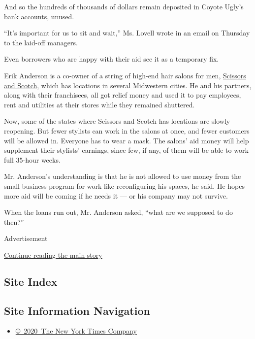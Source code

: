 And so the hundreds of thousands of dollars remain deposited in Coyote
Ugly's bank accounts, unused.

``It's important for us to sit and wait,'' Ms. Lovell wrote in an email
on Thursday to the laid-off managers.

Even borrowers who are happy with their aid see it as a temporary fix.

Erik Anderson is a co-owner of a string of high-end hair salons for men,
\href{https://www.scissorsscotch.com/\#scissors-scotch}{Scissors and
Scotch}, which has locations in several Midwestern cities. He and his
partners, along with their franchisees, all got relief money and used it
to pay employees, rent and utilities at their stores while they remained
shuttered.

Now, some of the states where Scissors and Scotch has locations are
slowly reopening. But fewer stylists can work in the salons at once, and
fewer customers will be allowed in. Everyone has to wear a mask. The
salons' aid money will help supplement their stylists' earnings, since
few, if any, of them will be able to work full 35-hour weeks.

Mr. Anderson's understanding is that he is not allowed to use money from
the small-business program for work like reconfiguring his spaces, he
said. He hopes more aid will be coming if he needs it --- or his company
may not survive.

When the loans run out, Mr. Anderson asked, ``what are we supposed to do
then?''

Advertisement

\protect\hyperlink{after-bottom}{Continue reading the main story}

\hypertarget{site-index}{%
\subsection{Site Index}\label{site-index}}

\hypertarget{site-information-navigation}{%
\subsection{Site Information
Navigation}\label{site-information-navigation}}

\begin{itemize}
\tightlist
\item
  \href{https://help.nytimes3xbfgragh.onion/hc/en-us/articles/115014792127-Copyright-notice}{©~2020~The
  New York Times Company}
\end{itemize}

